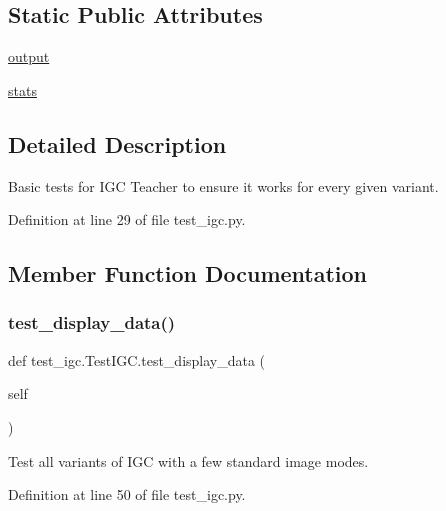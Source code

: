 \subsection*{Static Public Attributes}
\begin{DoxyCompactItemize}
\item 
\hyperlink{classtest__igc_1_1TestIGC_a3bc44f1296b0ba691b60952a3f1f55bb}{output}
\item 
\hyperlink{classtest__igc_1_1TestIGC_a4e3d2d771dfc83c2a941386a9f98cb64}{stats}
\end{DoxyCompactItemize}


\subsection{Detailed Description}
\begin{DoxyVerb}Basic tests for IGC Teacher to ensure it works for every given variant.
\end{DoxyVerb}
 

Definition at line 29 of file test\+\_\+igc.\+py.



\subsection{Member Function Documentation}
\mbox{\label{classtest__igc_1_1TestIGC_a3e0489229f985e12587c593781cf785a}} 
\subsubsection{\texorpdfstring{test\+\_\+display\+\_\+data()}{test\_display\_data()}}
{\footnotesize\ttfamily def test\+\_\+igc.\+Test\+I\+G\+C.\+test\+\_\+display\+\_\+data (\begin{DoxyParamCaption}\item[{}]{self }\end{DoxyParamCaption})}

\begin{DoxyVerb}Test all variants of IGC with a few standard image modes.
\end{DoxyVerb}
 

Definition at line 50 of file test\+\_\+igc.\+py.


